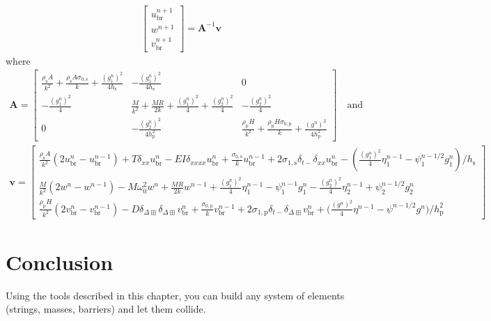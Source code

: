 \documentclass{article}
\begin{document}
\begin{align}
\begin{bmatrix}
        u^{n+1}_\text{br}\\
        w^{n+1}\\
        v^{n+1}_\text{br}
    \end{bmatrix}
    = 
    \mathbf{A}^{-1}\mathbf{v}
\end{align}
where
\begin{equation}
\begin{gathered}
\mathbf{A} = 
    \begin{bmatrix}
        \frac{\rho_\text{s} A}{k^2} + \frac{\rho_\text{s}A\sigma_{0,\text{s}}}{k} + \frac{(g_1^n)^2}{4h_\text{s}} & -\frac{(g_1^n)^2}{4h_\text{s}} & 0 \\
        -\frac{(g_1^n)^2}{4} & \frac{M}{k^2}+\frac{MR}{2k}+\frac{(g_1^n)^2}{4}+\frac{(g_2^n)^2}{4} &-\frac{(g_2^n)^2}{4}\\
        0 & -\frac{(g_2^n)^2}{4h_\text{p}^2} & \frac{\rho_\text{p}H}{k^2} + \frac{\rho_\text{p}H\sigma_{0,\text{p}}}{k} + \frac{(g^n)^2}{4h_\text{p}^2}
    \end{bmatrix}
    \quad \text{and}\\
    \mathbf{v} = 
    \begin{bmatrix}
        \frac{\rho_\text{s} A}{k^2}(2u^n_\text{br}-u_\text{br}^{n-1})+T\delta_{xx}u_\text{br}^n-EI\delta_{xxxx}u_\text{br}^n + \frac{\sigma_{0,\text{s}}}{k}u_\text{br}^{n-1} + 2\sigma_{1,\text{s}}\delta_{t-}\delta_{xx}u_\text{br}^n -\left(\frac{(g_1^n)^2}{4}\eta_1^{n-1}-\psi_1^{n-1/2}g_1^n\right)/h_\text{s}\\
        \frac{M}{k^2}(2w^n-w^{n-1})-M\omega_0^2w^n + \frac{MR}{2k}w^{n-1}+\frac{(g_1^n)^2}{4}\eta_1^{n-1}-\psi_1^{n-1}g_1^n-\frac{(g_2^n)^2}{4}\eta_2^{n-1}+\psi_2^{n-1/2}g_2^n\\
        \frac{\rho_\text{p}H}{k^2}(2v_\text{br}^n-v_\text{br}^{n-1})-D\delta_{\Delta\boxplus}\delta_{\Delta\boxplus}v_\text{br}^n+ \frac{\sigma_{0,\text{p}}}{k}v^{n-1}_\text{br} + 2\sigma_{1,\text{p}}\delta_{t-}\delta_{\Delta\boxplus}v^n_\text{br} + \Big(\frac{(g^n)^2}{4}\eta^{n-1}-\psi^{n-1/2}g^n\Big)/h_\text{p}^2
    \end{bmatrix}
    \nonumber
\end{gathered}
\end{equation}

\section{Conclusion}
Using the tools described in this chapter, you can build any system of elements (strings, masses, barriers) and let them collide.
\end{document}
